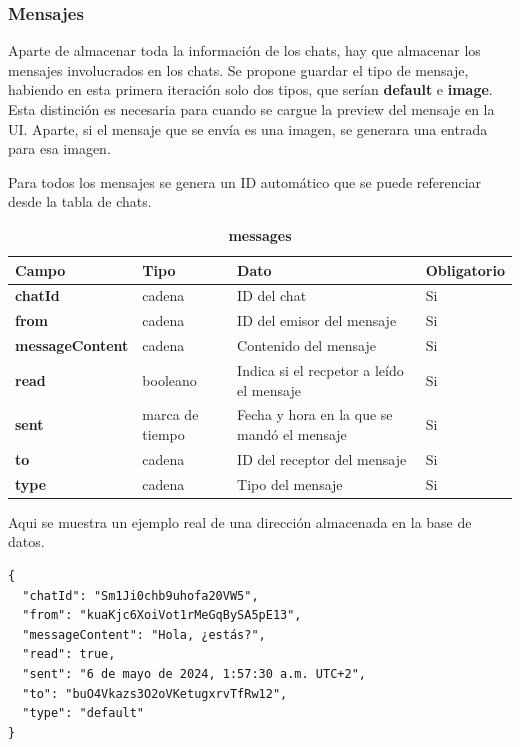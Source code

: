 \documentclass[a4paper, 12pt]{article}
\begin{document}
\subsubsection{Mensajes}

Aparte de almacenar toda la información de los chats, hay que almacenar los mensajes involucrados en los chats. Se propone guardar el tipo de mensaje, habiendo en esta primera iteración solo dos tipos, que serían \textbf{default} e \textbf{image}. Esta distinción es necesaria para cuando se cargue la preview del mensaje en la UI. Aparte, si el mensaje que se envía es una imagen, se generara una entrada para esa imagen.

Para todos los mensajes se genera un ID automático que se puede referenciar desde la tabla de chats.

\begin{table}[H]
\captionsetup{justification=raggedright,singlelinecheck=false}
\caption{\textbf{messages}}
\label{tab:messages}
	\begin{tabular}{|m{3.2cm}|m{2cm}|m{5cm}|m{3cm}|}
	\hline
	\textbf{Campo} & \textbf{Tipo} & \textbf{Dato} & \textbf{Obligatorio} \\ 
	\hline
	\textbf{chatId} & cadena & ID del chat & Si \\ 
	\hline
	\textbf{from} & cadena & ID del emisor del mensaje & Si \\ 
	\hline
	\textbf{messageContent} & cadena & Contenido del mensaje & Si \\ 
	\hline
	\textbf{read} & booleano & Indica si el recpetor a leído el mensaje & Si \\ 
	\hline
	\textbf{sent} & marca de tiempo & Fecha y hora en la que se mandó el mensaje & Si \\ 
	\hline
	\textbf{to} & cadena & ID del receptor del mensaje & Si \\ 
	\hline
	\textbf{type} & cadena & Tipo del mensaje & Si \\ 
	\hline
	\end{tabular}
\end{table}

Aqui se muestra un ejemplo real de una dirección almacenada en la base de datos.

\begin{verbatim}
{
  "chatId": "Sm1Ji0chb9uhofa20VW5",
  "from": "kuaKjc6XoiVot1rMeGqBySA5pE13",
  "messageContent": "Hola, ¿estás?",
  "read": true,
  "sent": "6 de mayo de 2024, 1:57:30 a.m. UTC+2",
  "to": "buO4Vkazs3O2oVKetugxrvTfRw12",
  "type": "default"
}
\end{verbatim}
\end{document}
